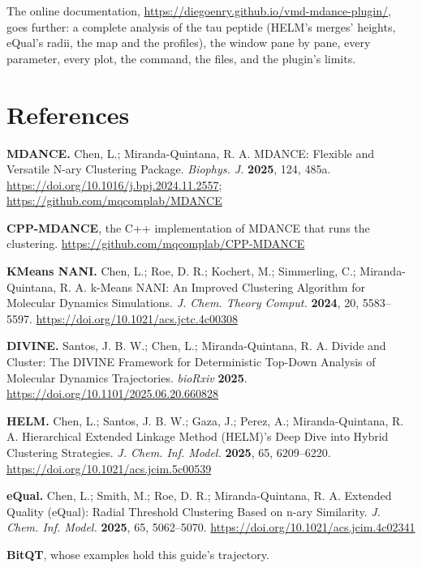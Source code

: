 \documentclass[11pt,letterpaper]{article}
\begin{document}
The online documentation, \url{https://diegoenry.github.io/vmd-mdance-plugin/},
goes further: a complete analysis of the tau peptide (HELM's merges' heights,
eQual's radii, the map and the profiles), the window pane by pane, every
parameter, every plot, the command, the files, and the plugin's limits.

\section*{References}
\label{sec:references}

{\small
\begin{enumerate}[label={[\arabic*]},leftmargin=*,itemsep=0.3ex]
\item \textbf{MDANCE.} Chen, L.; Miranda-Quintana, R. A. MDANCE: Flexible and
  Versatile N-ary Clustering Package. \emph{Biophys. J.} \textbf{2025}, 124,
  485a. \url{https://doi.org/10.1016/j.bpj.2024.11.2557};
  \url{https://github.com/mqcomplab/MDANCE}
\item \textbf{CPP-MDANCE}, the C++ implementation of MDANCE that runs the
  clustering. \url{https://github.com/mqcomplab/CPP-MDANCE}
\item \textbf{KMeans NANI.} Chen, L.; Roe, D. R.; Kochert, M.; Simmerling, C.;
  Miranda-Quintana, R. A. k-Means NANI: An Improved Clustering Algorithm for
  Molecular Dynamics Simulations. \emph{J. Chem. Theory Comput.}
  \textbf{2024}, 20, 5583--5597. \url{https://doi.org/10.1021/acs.jctc.4c00308}
\item \textbf{DIVINE.} Santos, J. B. W.; Chen, L.; Miranda-Quintana, R. A.
  Divide and Cluster: The DIVINE Framework for Deterministic Top-Down Analysis
  of Molecular Dynamics Trajectories. \emph{bioRxiv} \textbf{2025}.
  \url{https://doi.org/10.1101/2025.06.20.660828}
\item \textbf{HELM.} Chen, L.; Santos, J. B. W.; Gaza, J.; Perez, A.;
  Miranda-Quintana, R. A. Hierarchical Extended Linkage Method (HELM)'s Deep
  Dive into Hybrid Clustering Strategies. \emph{J. Chem. Inf. Model.}
  \textbf{2025}, 65, 6209--6220. \url{https://doi.org/10.1021/acs.jcim.5c00539}
\item \textbf{eQual.} Chen, L.; Smith, M.; Roe, D. R.; Miranda-Quintana, R. A.
  Extended Quality (eQual): Radial Threshold Clustering Based on n-ary
  Similarity. \emph{J. Chem. Inf. Model.} \textbf{2025}, 65, 5062--5070.
  \url{https://doi.org/10.1021/acs.jcim.4c02341}
\item \textbf{BitQT}, whose examples hold this guide's trajectory.

\end{enumerate}}
\end{document}
